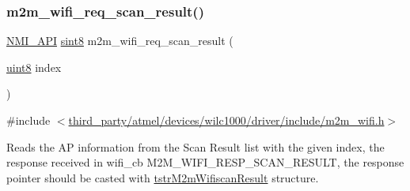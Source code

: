 \subsubsection{\texorpdfstring{m2m\+\_\+wifi\+\_\+req\+\_\+scan\+\_\+result()}{m2m\_wifi\_req\_scan\_result()}}
{\footnotesize\ttfamily \hyperlink{group__BSPDefine_gaecc0323d771e41ef81a76b5f12783e22}{N\+M\+I\+\_\+\+A\+PI} \hyperlink{group__DataT_gae35f10ffd0ac8dd2bc3e794da9bdfbc7}{sint8} m2m\+\_\+wifi\+\_\+req\+\_\+scan\+\_\+result (\begin{DoxyParamCaption}\item[{\hyperlink{group__DataT_ga4df709a77647e870bbf1d955b8edc9a6}{uint8}}]{index }\end{DoxyParamCaption})}



{\ttfamily \#include $<$\hyperlink{m2m__wifi_8h}{third\+\_\+party/atmel/devices/wilc1000/driver/include/m2m\+\_\+wifi.\+h}$>$}



Reads the AP information from the Scan Result list with the given index, the response received in wifi\+\_\+cb M2\+M\+\_\+\+W\+I\+F\+I\+\_\+\+R\+E\+S\+P\+\_\+\+S\+C\+A\+N\+\_\+\+R\+E\+S\+U\+LT, the response pointer should be casted with \hyperlink{structtstrM2mWifiscanResult}{tstr\+M2m\+Wifiscan\+Result} structure. 


